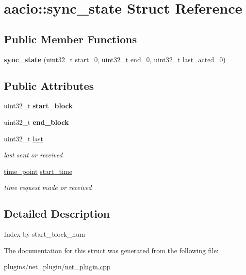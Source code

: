 \hypertarget{structaacio_1_1sync__state}{}\section{aacio\+:\+:sync\+\_\+state Struct Reference}
\label{structaacio_1_1sync__state}
\subsection*{Public Member Functions}
\begin{DoxyCompactItemize}
\item 
\mbox{\label{structaacio_1_1sync__state_ae439c2d389384bb5fa4b24b3c68c2d74}} 
{\bfseries sync\+\_\+state} (uint32\+\_\+t start=0, uint32\+\_\+t end=0, uint32\+\_\+t last\+\_\+acted=0)
\end{DoxyCompactItemize}
\subsection*{Public Attributes}
\begin{DoxyCompactItemize}
\item 
\mbox{\label{structaacio_1_1sync__state_a892f695f515766b4fe2b9cb1f3e3fb72}} 
uint32\+\_\+t {\bfseries start\+\_\+block}
\item 
\mbox{\label{structaacio_1_1sync__state_a938a2d065f01cea7c21eefa39545f50c}} 
uint32\+\_\+t {\bfseries end\+\_\+block}
\item 
\mbox{\label{structaacio_1_1sync__state_a86351b13eb0265e45733bc1d4ab7bc08}} 
uint32\+\_\+t \mbox{\hyperlink{structaacio_1_1sync__state_a86351b13eb0265e45733bc1d4ab7bc08}{last}}
\begin{DoxyCompactList}\small\item\em last sent or received \end{DoxyCompactList}\item 
\mbox{\label{structaacio_1_1sync__state_a04dcf1f23f9ac43577d61470779d4e67}} 
\mbox{\hyperlink{classfc_1_1time__point}{time\+\_\+point}} \mbox{\hyperlink{structaacio_1_1sync__state_a04dcf1f23f9ac43577d61470779d4e67}{start\+\_\+time}}
\begin{DoxyCompactList}\small\item\em time request made or received \end{DoxyCompactList}\end{DoxyCompactItemize}


\subsection{Detailed Description}
Index by start\+\_\+block\+\_\+num 

The documentation for this struct was generated from the following file\+:\begin{DoxyCompactItemize}
\item 
plugins/net\+\_\+plugin/\mbox{\hyperlink{net__plugin_8cpp}{net\+\_\+plugin.\+cpp}}\end{DoxyCompactItemize}
